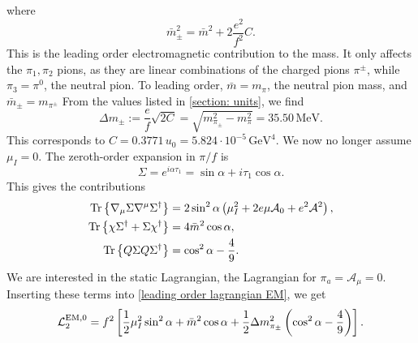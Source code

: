 %
where
\begin{equation}
    \bar m_\pm^2 = \bar m^2 + 2\frac{e^2}{f^2}C.
\end{equation}
%
This is the leading order electromagnetic contribution to the mass.
It only affects the $\pi_1, \pi_2$ pions, as they are linear combinations of the charged pions $\pi^\pm$, while $\pi_3 = \pi^0$, the neutral pion.
To leading order, $\bar m = m_\pi$, the neutral pion mass, and $\bar m_{\pm} = m_{\pi^{\pm}}$
From the values listed in \autoref{section: units}, we find
%
\begin{equation}
    \label{EM mass contribtuion leading order}
    \Delta m_{\pm} := \frac{e}{f}\sqrt{2C} = \sqrt{m_{\pi_\pm}^2 - m_{\pi}^2} = 35.50 \, \text{MeV}.
\end{equation}
%
This corresponds to $C = 0.3771 \, u_0 = 5.824 \cdot 10^{-5} \, \text{GeV}^4$.
We now no longer assume $\mu_I = 0$.
The zeroth-order expansion in $\pi/f$ is
%
\begin{equation}
    \Sigma = e^{i \alpha \tau_1} = \sin \alpha + i \tau_1 \cos \alpha.
\end{equation}
%
This gives the contributions
%
\begin{align}
    \text{Tr} \left\{ \nabla_\mu \Sigma \nabla^\mu \Sigma^\dagger \right\}
    & = 2 \sin^2\alpha\left(\mu_I^2 + 2 e \mu \mathcal A_0 + e^2\mathcal A^2 \right), \\
    \text{Tr} \left\{ \chi \Sigma^\dagger + \Sigma \chi^\dagger \right\}
    & =4 \bar m^2 \cos \alpha,\\
    \text{Tr} \left\{ Q \Sigma Q \Sigma^\dagger \right\}
    & =  \cos^2 \alpha - \frac{4}{9}.
\end{align}
%
We are interested in the static Lagrangian, the Lagrangian for $\pi_a = \mathcal A_\mu = 0$.
Inserting these terms into \autoref{leading order lagrangian EM}, we get
%
\begin{equation}
    \label{static lagrangian with EM}
    \mathcal{L}^{\text{EM}, 0}_2
    = f^2 \left[
        \frac{1}{2}\mu_I^2 \sin^2 \alpha + \bar m^2 \cos \alpha 
        + \frac{1}{2} \Delta m^2_{\pi_\pm} \left(\cos^2 \alpha - \frac{4}{9}\right)
    \right].
\end{equation}
%

